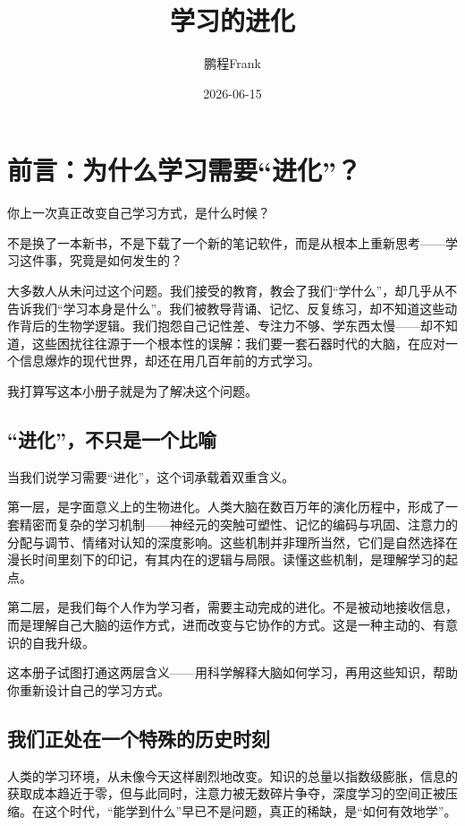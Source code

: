\documentclass[11pt]{article}
\author{鹏程Frank}
\date{2026-06-15}
\title{学习的进化}
\begin{document}
\maketitle
\tableofcontents

\section{前言：为什么学习需要“进化”？}
\label{sec:orgc6bb828}

你上一次真正改变自己学习方式，是什么时候？

不是换了一本新书，不是下载了一个新的笔记软件，而是从根本上重新思考——学习这件事，究竟是如何发生的？

大多数人从未问过这个问题。我们接受的教育，教会了我们“学什么”，却几乎从不告诉我们“学习本身是什么”。我们被教导背诵、记忆、反复练习，却不知道这些动作背后的生物学逻辑。我们抱怨自己记性差、专注力不够、学东西太慢——却不知道，这些困扰往往源于一个根本性的误解：我们要一套石器时代的大脑，在应对一个信息爆炸的现代世界，却还在用几百年前的方式学习。

我打算写这本小册子就是为了解决这个问题。
\subsection{“进化”，不只是一个比喻}
\label{sec:org238621a}

当我们说学习需要“进化”，这个词承载着双重含义。

第一层，是字面意义上的生物进化。人类大脑在数百万年的演化历程中，形成了一套精密而复杂的学习机制——神经元的突触可塑性、记忆的编码与巩固、注意力的分配与调节、情绪对认知的深度影响。这些机制并非理所当然，它们是自然选择在漫长时间里刻下的印记，有其内在的逻辑与局限。读懂这些机制，是理解学习的起点。

第二层，是我们每个人作为学习者，需要主动完成的进化。不是被动地接收信息，而是理解自己大脑的运作方式，进而改变与它协作的方式。这是一种主动的、有意识的自我升级。

这本册子试图打通这两层含义——用科学解释大脑如何学习，再用这些知识，帮助你重新设计自己的学习方式。
\subsection{我们正处在一个特殊的历史时刻}
\label{sec:orge690b83}

人类的学习环境，从未像今天这样剧烈地改变。知识的总量以指数级膨胀，信息的获取成本趋近于零，但与此同时，注意力被无数碎片争夺，深度学习的空间正被压缩。在这个时代，“能学到什么”早已不是问题，真正的稀缺，是“如何有效地学”。
\end{document}
